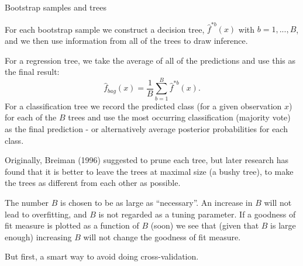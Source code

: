 \documentclass[ignorenonframetext,]{beamer}
\begin{document}
\begin{frame}

\begin{block}{Bootstrap samples and trees}

For each bootstrap sample we construct a decision tree,
\(\hat{f}^{*b}(x)\) with \(b=1,...,B\), and we then use information from
all of the trees to draw inference.

For a regression tree, we take the average of all of the predictions and
use this as the final result: \[
\hat{f}_{bag}(x)=\frac{1}{B}\sum_{b=1}^B \hat{f}^{*b}(x).
\] For a classification tree we record the predicted class (for a given
observation \(x\)) for each of the \(B\) trees and use the most
occurring classification (majority vote) as the final prediction - or
alternatively average posterior probabilities for each class.

\end{block}

\end{frame}

\begin{frame}

Originally, Breiman (1996) suggested to prune each tree, but later
research has found that it is better to leave the trees at maximal size
(a bushy tree), to make the trees as different from each other as
possible.

The number \(B\) is chosen to be as large as ``necessary''. An increase
in \(B\) will not lead to overfitting, and \(B\) is not regarded as a
tuning parameter. If a goodness of fit measure is plotted as a function
of \(B\) (soon) we see that (given that \(B\) is large enough)
increasing \(B\) will not change the goodness of fit measure.

But first, a smart way to avoid doing cross-validation.

\end{frame}
\end{document}
